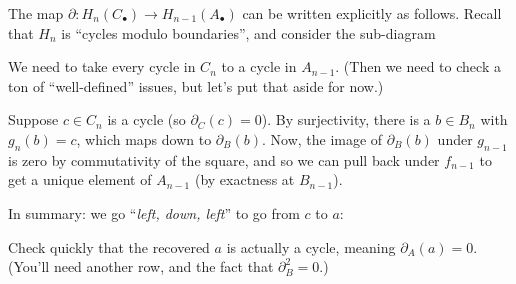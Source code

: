 \begin{remark}
	\label{rem:leftdownleft}
	The map $\partial \colon H_n(C_\bullet) \to H_{n-1}(A_\bullet)$ can be written explicitly as follows.
	Recall that $H_n$ is ``cycles modulo boundaries'', and consider the sub-diagram
	\begin{center}
	\end{center}
	We need to take every cycle in $C_n$ to a cycle in $A_{n-1}$.
	(Then we need to check a ton of ``well-defined'' issues,
	but let's put that aside for now.)

	Suppose $c \in C_n$ is a cycle (so $\partial_C(c) = 0$).
	By surjectivity, there is a $b \in B_n$ with $g_n(b) = c$,
	which maps down to $\partial_B(b)$.
	Now, the image of $\partial_B(b)$ under $g_{n-1}$ is zero by commutativity of the square,
	and so we can pull back under $f_{n-1}$ to get a unique element of $A_{n-1}$
	(by exactness at $B_{n-1}$).

	In summary: we go ``\emph{left, down, left}'' to go from $c$ to $a$:
	\begin{center}
	\end{center}
\end{remark}
\begin{exercise}
	Check quickly that the recovered $a$ is actually a cycle,
	meaning $\partial_A(a) = 0$.
	(You'll need another row, and the fact that $\partial_B^2 = 0$.)
\end{exercise}


